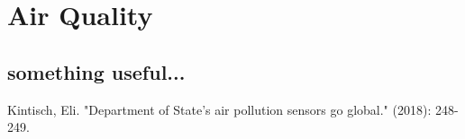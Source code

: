 \chapter{Air Quality}

\section{something useful...}

Kintisch, Eli. "Department of State's air pollution sensors go global." (2018): 248-249.